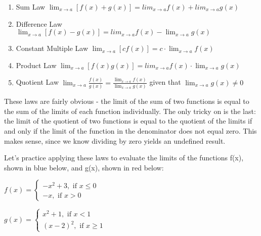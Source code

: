 \begin{enumerate}
    \item Sum Law $\lim_{x\to a} \left[f(x) + g(x) \right] = lim_{x\to a} f(x) + lim_{x\to a} g(x)$
    \item Difference Law $\lim_{x\to a} \left[f(x) - g(x) \right] = lim_{x\to a} f(x) - \lim_{x\to a} g(x)$
    \item Constant Multiple Law $\lim_{x\to a} \left[\textit{c}f(x) \right] = \textit{c} \cdot \lim_{x\to a}    f(x) $
    \item Product Law $\lim_{x\to a} \left[f(x)g(x) \right] = lim_{x\to a}f(x) \cdot \lim_{x\to a} g(x)$
    \item Quotient Law $\lim_{x\to a} \frac{f(x)}{g(x)} = \frac{\lim_{x\to a} f(x)}{\lim_{x\to a} g(x)}$ given that $\lim_{x\to a} g(x) \neq 0$
\end{enumerate}
These laws are fairly obvious - the limit of the sum of two functions is equal to the sum of the limits of each function individually. The only tricky on is the last: the limit of the quotient of two functions is equal to the quotient of the limits if and only if the limit of the function in the denominator does not equal zero. This makes sense, since we know dividing by zero yields an undefined result. 

Let's practice applying these laws to evaluate the limits of the functions f(x), shown in blue below, and g(x), shown in red below:

$f(x) = \begin{cases}
    -x^2+3, \text{ if } x \leq 0\\
    -x, \text{ if } x > 0
\end{cases}$

$g(x) = \begin{cases}
   x^2+1, \text{ if } x < 1 \\
    (x-2)^2, \text{ if } x \geq 1
\end{cases}$


